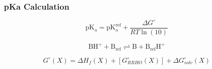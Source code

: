 
\usebackgroundtemplate{}

\begin{frame}[fragile]
    \addtocounter{framenumber}{-1}
    \frametitle{}
\end{frame}

\begin{frame}[fragile]
    \addtocounter{framenumber}{-1}
    \frametitle{pKa Calculation}

    \begin{equation}
    \mathrm{pK_a}=\mathrm{pK_a^{ref}} + \frac{\Delta G^\circ}{RT\ln (10)} 
    \end{equation}

    \bigskip

    \begin{equation}
    \mathrm{ BH^+ + B_{ref} \rightleftharpoons B + B_{ref}H^+ }
    \end{equation}

    \bigskip

    \begin{equation}
    \label{eqn:deltag}
    G^\circ(X) = \Delta H_f(X) + [G^\circ_{RRHO}(X)]+\Delta G^\circ_{solv}(X)
    \end{equation}

\end{frame}





